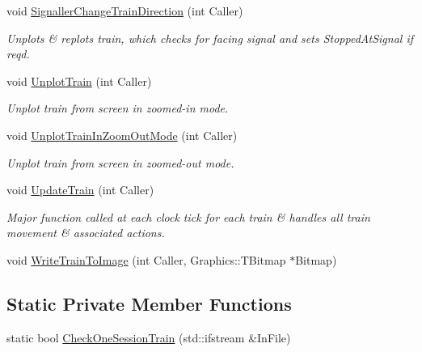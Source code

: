 \begin{DoxyCompactItemize}
\mbox{\label{class_t_train_affbb94aa088370056f8ca8c45a1fdd48}} 
void \mbox{\hyperlink{class_t_train_affbb94aa088370056f8ca8c45a1fdd48}{Signaller\+Change\+Train\+Direction}} (int Caller)
\begin{DoxyCompactList}\small\item\em Unplots \& replots train, which checks for facing signal and sets Stopped\+At\+Signal if req\textquotesingle{}d. \end{DoxyCompactList}\item 
\mbox{\label{class_t_train_a4978a3050ca943076eb6cbd03eeee1d4}} 
void \mbox{\hyperlink{class_t_train_a4978a3050ca943076eb6cbd03eeee1d4}{Unplot\+Train}} (int Caller)
\begin{DoxyCompactList}\small\item\em Unplot train from screen in zoomed-\/in mode. \end{DoxyCompactList}\item 
\mbox{\label{class_t_train_a439d2809c762a0981908a3b8a49520f2}} 
void \mbox{\hyperlink{class_t_train_a439d2809c762a0981908a3b8a49520f2}{Unplot\+Train\+In\+Zoom\+Out\+Mode}} (int Caller)
\begin{DoxyCompactList}\small\item\em Unplot train from screen in zoomed-\/out mode. \end{DoxyCompactList}\item 
\mbox{\label{class_t_train_a89ad640ecf8f5163c40727b4e28575fc}} 
void \mbox{\hyperlink{class_t_train_a89ad640ecf8f5163c40727b4e28575fc}{Update\+Train}} (int Caller)
\begin{DoxyCompactList}\small\item\em Major function called at each clock tick for each train \& handles all train movement \& associated actions. \end{DoxyCompactList}\item 
void \mbox{\hyperlink{class_t_train_a86107a63225b0500b29e049f13545fff}{Write\+Train\+To\+Image}} (int Caller, Graphics\+::\+T\+Bitmap $\ast$Bitmap)
\end{DoxyCompactItemize}
\subsection*{Static Private Member Functions}
\begin{DoxyCompactItemize}
\item 
static bool \mbox{\hyperlink{class_t_train_aad716bab6f8f4aa6dd49f35130d28dd9}{Check\+One\+Session\+Train}} (std\+::ifstream \&In\+File)
\end{DoxyCompactItemize}

